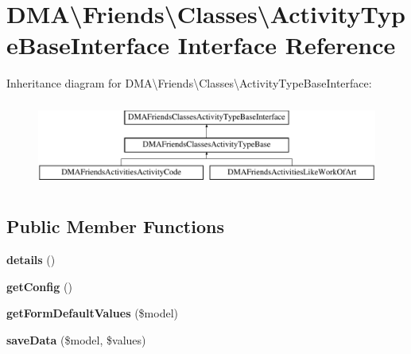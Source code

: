 \hypertarget{interfaceDMA_1_1Friends_1_1Classes_1_1ActivityTypeBaseInterface}{\section{D\+M\+A\textbackslash{}Friends\textbackslash{}Classes\textbackslash{}Activity\+Type\+Base\+Interface Interface Reference}
\label{interfaceDMA_1_1Friends_1_1Classes_1_1ActivityTypeBaseInterface}
}
Inheritance diagram for D\+M\+A\textbackslash{}Friends\textbackslash{}Classes\textbackslash{}Activity\+Type\+Base\+Interface\+:\begin{figure}[H]
\begin{center}
\leavevmode
\includegraphics[height=2.837838cm]{db/d56/interfaceDMA_1_1Friends_1_1Classes_1_1ActivityTypeBaseInterface}
\end{center}
\end{figure}
\subsection*{Public Member Functions}
\begin{DoxyCompactItemize}
\item 
\hypertarget{interfaceDMA_1_1Friends_1_1Classes_1_1ActivityTypeBaseInterface_a9713aa0c2dcce44a56c2e0dc489b5ff3}{{\bfseries details} ()}\label{interfaceDMA_1_1Friends_1_1Classes_1_1ActivityTypeBaseInterface_a9713aa0c2dcce44a56c2e0dc489b5ff3}

\item 
\hypertarget{interfaceDMA_1_1Friends_1_1Classes_1_1ActivityTypeBaseInterface_ae1984840bbcdb6c60e009c3a0169c40d}{{\bfseries get\+Config} ()}\label{interfaceDMA_1_1Friends_1_1Classes_1_1ActivityTypeBaseInterface_ae1984840bbcdb6c60e009c3a0169c40d}

\item 
\hypertarget{interfaceDMA_1_1Friends_1_1Classes_1_1ActivityTypeBaseInterface_a805df9abe58a33ab5b9982275a935385}{{\bfseries get\+Form\+Default\+Values} (\$model)}\label{interfaceDMA_1_1Friends_1_1Classes_1_1ActivityTypeBaseInterface_a805df9abe58a33ab5b9982275a935385}

\item 
\hypertarget{interfaceDMA_1_1Friends_1_1Classes_1_1ActivityTypeBaseInterface_a0ac44f06880aa9cfcec9af2e81186aec}{{\bfseries save\+Data} (\$model, \$values)}\label{interfaceDMA_1_1Friends_1_1Classes_1_1ActivityTypeBaseInterface_a0ac44f06880aa9cfcec9af2e81186aec}

\end{DoxyCompactItemize}
